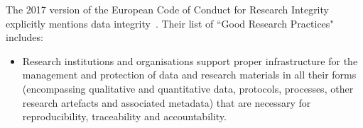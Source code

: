 \documentclass[review]{elsarticle}
\begin{document}
The 2017 version of the European Code of Conduct for Research Integrity explicitly mentions data integrity~\cite{eu-code}. 
Their list of ``Good Research Practices" includes:

\begin{itemize}
\item Research institutions and organisations
support proper infrastructure for the
management and protection of data
and research materials in all their forms
(encompassing qualitative and quantitative
data, protocols, processes, other research
artefacts and associated metadata) that are
necessary for reproducibility, traceability
and accountability.
\end{itemize}


\end{document}
